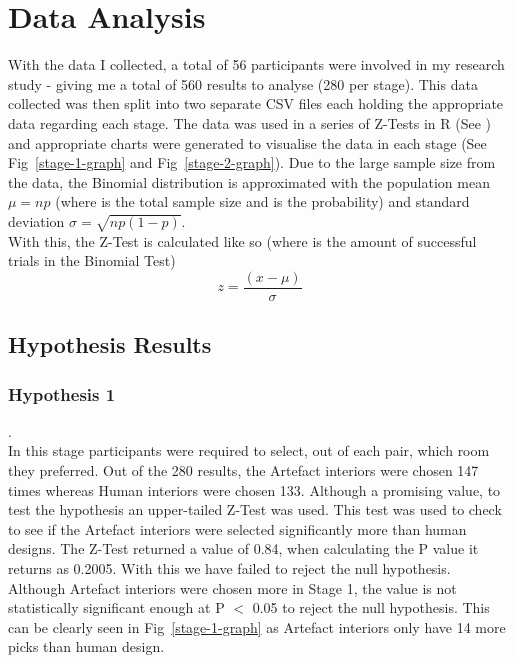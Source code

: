 \section{Data Analysis}
With the data I collected, a total of 56 participants were involved in my research study - giving me a total of 560 results to analyse (280 per stage). This data collected was then split into two separate CSV files each holding the appropriate data regarding each stage. The data was used in a series of Z-Tests in R (See \hyperref[append:g]{}) and appropriate charts were generated to visualise the data in each stage (See Fig~\ref{stage-1-graph} and Fig~\ref{stage-2-graph}).
Due to the large sample size from the data, the Binomial distribution is approximated with the population mean \(\mu = np\) (where  is the total sample size and  is the probability) and standard deviation \(\sigma = \sqrt{np(1-p)}\). 
\\
With this, the Z-Test is calculated like so (where  is the amount of successful trials in the Binomial Test)
\[z = \frac{(x - \mu ) }{\sigma }\]

\subsection{Hypothesis Results}
\subsubsection{Hypothesis 1}
.\\
In this stage participants were required to select, out of each pair, which room they preferred. Out of the 280 results, the Artefact interiors were chosen 147 times whereas Human interiors were chosen 133. Although a promising value, to test the hypothesis an upper-tailed Z-Test was used.
This test was used to check to see if the Artefact interiors were selected significantly more than human designs. The Z-Test returned a value of 0.84, when calculating the P value it returns as 0.2005. With this we have failed to reject the null hypothesis. Although Artefact interiors were chosen more in Stage 1, the value is not statistically significant enough at P $<$ 0.05 to reject the null hypothesis. This can be clearly seen in Fig~\ref{stage-1-graph} as Artefact interiors only have 14 more picks than human design. 
